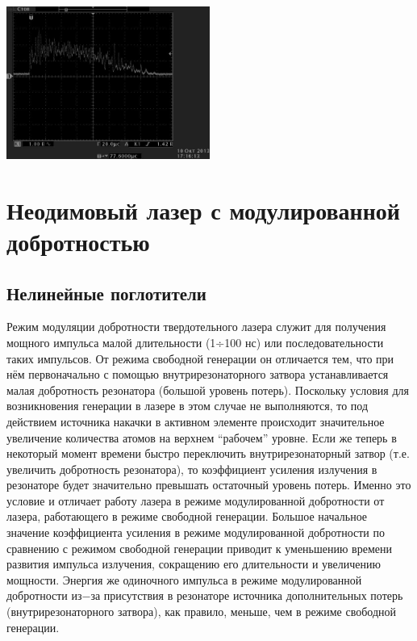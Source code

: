\documentclass[twocolumn]{article}
\begin{document}
    
      
    \begin{center}
    \includegraphics[width=0.5\textwidth]{LEMPH Report_files/LEMPH Report_29_0.jpeg}
    \par
    \end{center}
    
         
            
        
    
\section{Неодимовый лазер с модулированной добротностью}\subsection{Нелинейные поглотители}Режим модуляции добротности твердотельного лазера служит для получения
мощного импульса малой длительности (1÷100 нс) или последовательности
таких импульсов. От режима свободной генерации он отличается тем, что
при нём первоначально с помощью внутрирезонаторного затвора
устанавливается малая добротность резонатора (большой уровень потерь).
Поскольку условия для возникновения генерации в лазере в этом случае не
выполняются, то под действием источника накачки в активном элементе
происходит значительное увеличение количества атомов на верхнем
``рабочем'' уровне. Если же теперь в некоторый момент времени быстро
переключить внутрирезонаторный затвор (т.е. увеличить добротность
резонатора), то коэффициент усиления излучения в резонаторе будет
значительно превышать остаточный уровень потерь. Именно это условие и
отличает работу лазера в режиме модулированной добротности от лазера,
работающего в режиме свободной генерации. Большое начальное значение
коэффициента усиления в режиме модулированной добротности по сравнению с
режимом свободной генерации приводит к уменьшению времени развития
импульса излучения, сокращению его длительности и увеличению мощности.
Энергия же одиночного импульса в режиме модулированной добротности из−за
присутствия в резонаторе источника дополнительных потерь
(внутрирезонаторного затвора), как правило, меньше, чем в режиме
свободной генерации.
\end{document}
